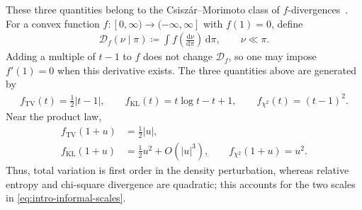 \documentclass[11pt,reqno]{amsart}
\numberwithin{equation}{section}
\theoremstyle{plain}
\theoremstyle{remark}
\newcommand{\md}{\mathrm{d}}
\begin{document}
These three quantities belong to the Csisz\'ar--Morimoto class of \(f\)-divergences~\cite{AliSilvey1966,Csiszar1967}.  For a convex function \(f:[0,\infty)\to(-\infty,\infty]\) with \(f(1)=0\), define
\begin{align}\label{eq:f-divergence-definition}
 \mathscr D_f(\nu\mid\pi)
 \coloneqq
 \int f\!\left(\frac{\md\nu}{\md\pi}\right)\,\md\pi,
 \qquad \nu\ll\pi.
\end{align}
Adding a multiple of \(t-1\) to \(f\) does not change \(\mathscr D_f\), so one may impose \(f'(1)=0\) when this derivative exists.  The three quantities above are generated by
\begin{align}\label{eq:principal-f-divergence-generators}
 f_{\mathrm{TV}}(t)=\frac12|t-1|,
 \qquad
 f_{\mathrm{KL}}(t)=t\log t-t+1,
 \qquad
 f_{\chi^2}(t)=(t-1)^2.
\end{align}
Near the product law,
\begin{align}
 f_{\mathrm{TV}}(1+u)&=\frac12|u|,
 \label{eq:f-TV-local-order}\\
 f_{\mathrm{KL}}(1+u)&=\frac12u^2+O(|u|^3),
 \qquad
 f_{\chi^2}(1+u)=u^2.
 \label{eq:f-quadratic-local-order}
\end{align}
Thus, total variation is first order in the density perturbation, whereas relative entropy and chi-square divergence are quadratic; this accounts for the two scales in \eqref{eq:intro-informal-scales}.
\end{document}
